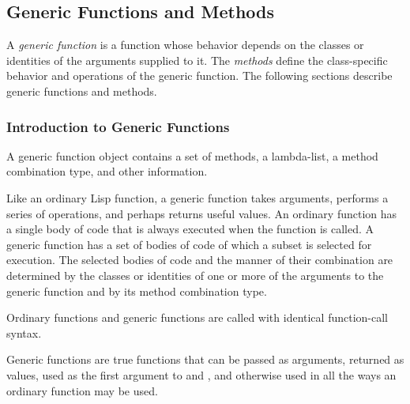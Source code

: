 \subsection{Generic Functions and Methods}

A \emph{generic function} is a function whose behavior depends on
the classes or identities of the arguments supplied to it.  The \emph{methods}
define the class-specific behavior and operations of the 
generic function. The following sections describe generic functions
and methods.

\subsubsection{Introduction to Generic Functions}

A generic function object contains a set of methods, a
lambda-list, a method combination type, and other information.

Like an ordinary Lisp function, a generic function takes arguments,
performs a series of operations, and perhaps returns useful values.
An ordinary function has a single body of code that is always executed
when the function is called.  A generic function has a set of bodies
of code of which a subset is selected for execution. The selected
bodies of code and the manner of their combination are determined by
the classes or identities of one or more of the arguments to the
generic function and by its method combination type.

Ordinary functions and generic functions are called with identical function-call
syntax.
 
Generic functions are true functions that can be passed as arguments, returned as values,
used as the first argument to  and , and otherwise used in all the ways
an ordinary function may be used.


